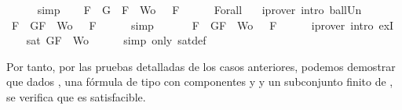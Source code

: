 \begin{isabellebody}
\ \ \ \ \isamarkupfalse%
\ simp\isanewline
\ \ \isamarkupfalse%
\ {\isachardoublequoteopen}{\isasymforall}F\ {\isasymin}\ {\isacharparenleft}{\isacharbraceleft}G{\isacharbraceright}{\isacharparenright}\ {\isasymunion}\ {\isacharparenleft}{\isacharbraceleft}F{\isacharbraceright}\ {\isasymunion}\ Wo{\isacharparenright}{\isachardot}\ {\isasymA}\ {\isasymTurnstile}\ F{\isachardoublequoteclose}\isanewline
\ \ \ \ \isamarkupfalse%
\ Forall{}\ {}\ \isamarkupfalse%
\ {\isacharparenleft}iprover\ intro{\isacharcolon}\ ball{\isacharunderscore}Un{\isacharparenright}\isanewline
\ \ \isamarkupfalse%
\ \isamarkupfalse%
\ {\isachardoublequoteopen}{\isasymforall}F\ {\isasymin}\ {\isacharbraceleft}G{\isacharcomma}F{\isacharbraceright}\ {\isasymunion}\ Wo{\isachardot}\ {\isasymA}\ {\isasymTurnstile}\ F{\isachardoublequoteclose}\isanewline
\ \ \ \ \isamarkupfalse%
\ simp\isanewline
\ \ \isamarkupfalse%
\ \isamarkupfalse%
\ {\isachardoublequoteopen}{\isasymexists}{\isasymA}{\isachardot}\ {\isasymforall}F\ {\isasymin}\ {\isacharparenleft}{\isacharbraceleft}G{\isacharcomma}F{\isacharbraceright}\ {\isasymunion}\ Wo{\isacharparenright}{\isachardot}\ {\isasymA}\ {\isasymTurnstile}\ F{\isachardoublequoteclose}\isanewline
\ \ \ \ \isamarkupfalse%
\ {\isacharparenleft}iprover\ intro{\isacharcolon}\ exI{\isacharparenright}\isanewline
\ \ \isamarkupfalse%
\ {\isachardoublequoteopen}sat\ {\isacharparenleft}{\isacharbraceleft}G{\isacharcomma}F{\isacharbraceright}\ {\isasymunion}\ Wo{\isacharparenright}{\isachardoublequoteclose}\isanewline
\ \ \ \ \isamarkupfalse%
\ {\isacharparenleft}simp\ only{\isacharcolon}\ sat{\isacharunderscore}def{\isacharparenright}\isanewline
{}\isamarkupfalse%
%
\endisatagproof
{\isafoldproof}%
%
\isadelimproof
%
\endisadelimproof
%
\begin{isamarkuptext}%
Por tanto, por las pruebas detalladas de los casos anteriores, podemos demostrar que dados 
  ,  una fórmula de tipo \isa{{\isasymalpha}} con componentes  y  y  un subconjunto finito 
  de , se verifica que  es satisfacible.%

\end{isamarkuptext}
\end{isabellebody}
